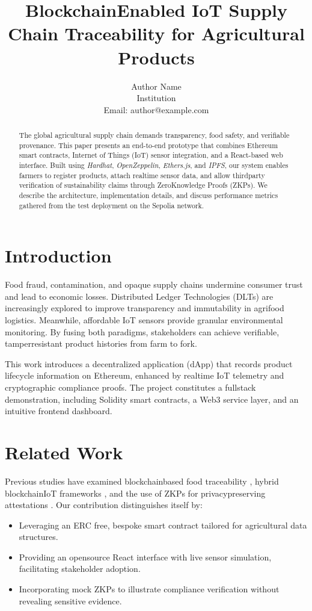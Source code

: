 \documentclass[conference]{IEEEtran}
\title{Blockchain\textendash Enabled IoT Supply Chain Traceability for Agricultural Products}
\author{Author Name\\Institution\\Email: author@example.com}
\begin{document}
\maketitle

\begin{abstract}
The global agricultural supply chain demands transparency, food safety, and verifiable provenance. This paper presents an end-to-end prototype that combines Ethereum smart contracts, Internet of Things (IoT) sensor integration, and a React-based web interface. Built using \textit{Hardhat}, \textit{OpenZeppelin}, \textit{Ethers.js}, and \textit{IPFS}, our system enables farmers to register products, attach real\textendash time sensor data, and allow third\textendash party verification of sustainability claims through Zero\textendash Knowledge Proofs (ZKPs). We describe the architecture, implementation details, and discuss performance metrics gathered from the test deployment on the Sepolia network.
\end{abstract}

\section{Introduction}
Food fraud, contamination, and opaque supply chains undermine consumer trust and lead to economic losses. Distributed Ledger Technologies (DLTs) are increasingly explored to improve transparency and immutability in agri\textendash food logistics. Meanwhile, affordable IoT sensors provide granular environmental monitoring. By fusing both paradigms, stakeholders can achieve verifiable, tamper\textendash resistant product histories from farm to fork.

This work introduces a decentralized application (dApp) that records product lifecycle information on Ethereum, enhanced by real\textendash time IoT telemetry and cryptographic compliance proofs. The project constitutes a full\textendash stack demonstration, including Solidity smart contracts, a Web3 service layer, and an intuitive front\textendash end dashboard.

\section{Related Work}
Previous studies have examined blockchain\textendash based food traceability \cite{tian2016agri}, hybrid blockchain\textendash IoT frameworks \cite{george2020iotbc}, and the use of ZKPs for privacy\textendash preserving attestations \cite{zhang2021zk}. Our contribution distinguishes itself by:
\begin{itemize}
    \item Leveraging an ERC free, bespoke smart contract tailored for agricultural data structures.
    \item Providing an open\textendash source React interface with live sensor simulation, facilitating stakeholder adoption.
    \item Incorporating mock ZKPs to illustrate compliance verification without revealing sensitive evidence.
\end{itemize}
\end{document}
